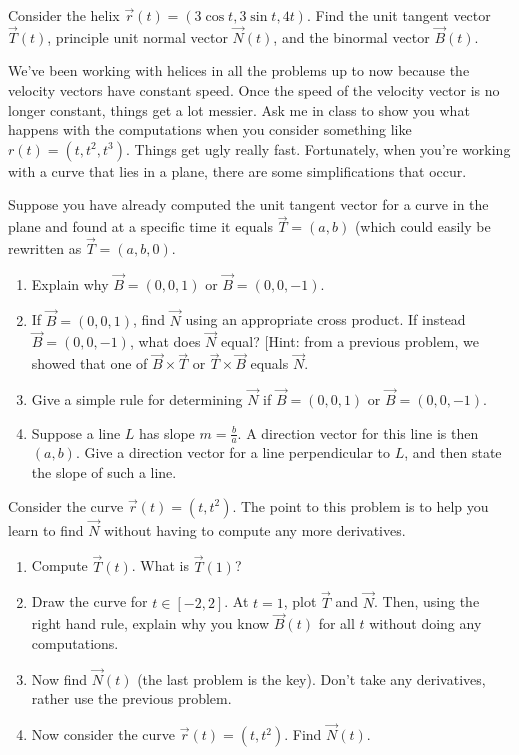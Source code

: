 \begin{problem} \label{helix example of T N and B}
%
Consider the helix $\vec r(t) = (3\cos t,3\sin t, 4t)$.  Find the unit tangent vector $\vec T(t)$, principle unit normal vector $\vec N(t)$, and the binormal vector $\vec B(t)$.  
\end{problem}

We've been working with helices in all the problems up to now because the velocity vectors have constant speed.  Once the speed of the velocity vector is no longer constant, things get a lot messier. Ask me in class to show you what happens with the computations when you consider something like $r(t)=(t,t^2,t^3)$. Things get ugly really fast. Fortunately, when you're working with a curve that lies in a plane, there are some simplifications that occur.

\begin{problem}
%
 Suppose you have already computed the unit tangent vector for a curve in the plane and found at a specific time it equals $\vec T=(a,b)$ (which could easily be rewritten as $\vec T = (a,b,0)$.   
\begin{enumerate}
 \item Explain why $\vec B=(0,0,1)$ or $\vec B=(0,0,-1)$.
 \item If $\vec B=(0,0,1)$, find $\vec N$ using an appropriate cross product. If instead $\vec B=(0,0,-1)$, what does $\vec N$ equal? [Hint: from a previous problem, we showed that one of $\vec B\times \vec T$ or $\vec T\times \vec B$ equals $\vec N$.
 \item Give a simple rule for determining $\vec N$ if $\vec B=(0,0,1)$ or $\vec B=(0,0,-1)$.
 \item Suppose a line $L$ has slope $m=\frac{b}{a}$. A direction vector for this line is then $(a,b)$.  Give a direction vector for a line perpendicular to $L$, and then state the slope of such a line.
\end{enumerate}
\end{problem}


\begin{problem}
%
Consider the curve $\vec r(t)=(t,t^2)$. The point to this problem is to help you learn to find $\vec N$ without having to compute any more derivatives.  
\begin{enumerate}
 \item Compute $\vec T(t)$.  What is $\vec T(1)$?
 \item Draw the curve for $t\in[-2,2]$.  At $t=1$, plot $\vec T$ and $\vec N$. Then, using the right hand rule, explain why you know $\vec B(t)$ for all $t$ without doing any computations.
 \item Now find $\vec N(t)$ (the last problem is the key). Don't take any derivatives, rather use the previous problem.
 \item Now consider the curve $\vec r(t)=(t,t^2)$. Find $\vec N(t)$.
\end{enumerate}
\end{problem}


